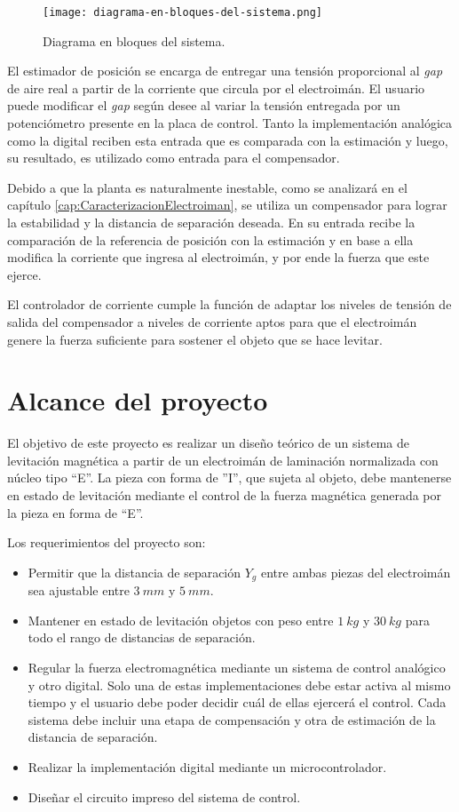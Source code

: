 \begin{figure}[H]
	\centering
	\texttt{[image: diagrama-en-bloques-del-sistema.png]}
	\caption{Diagrama en bloques del sistema.}
	\label{fig:img_diagrama-en-bloques-del-sistema}
\end{figure}

El estimador de posición se encarga de entregar una tensión proporcional al \textsl{gap} de aire real a partir de la corriente que circula por el electroimán. El usuario puede modificar el \textsl{gap} según desee al variar la tensión entregada por un potenciómetro presente en la placa de control. Tanto la implementación analógica como la digital reciben esta entrada que es comparada con la estimación y luego, su resultado, es utilizado como entrada para el compensador.

Debido a que la planta es naturalmente inestable, como se analizará en el capítulo \ref{cap:CaracterizacionElectroiman}, se utiliza un compensador para lograr la estabilidad y la distancia de separación deseada. En su entrada recibe la comparación de la referencia de posición con la estimación y en base a ella modifica la corriente que ingresa al electroimán, y por ende la fuerza que este ejerce.

El controlador de corriente cumple la función de adaptar los niveles de tensión de salida del compensador a niveles de corriente aptos para que el electroimán genere la fuerza suficiente para sostener el objeto que se hace levitar.


\section{Alcance del proyecto}

El objetivo de este proyecto es realizar un diseño teórico de un sistema de levitación magnética a partir de un electroimán de laminación normalizada con núcleo tipo “E''. La pieza con forma de ”I”, que sujeta al objeto, debe mantenerse en estado de levitación mediante el control de la fuerza magnética generada por la pieza en forma de “E”.

Los requerimientos del proyecto son:

\begin{itemize}
\item Permitir que la distancia de separación $Y_{g}$ entre ambas piezas del electroimán sea ajustable entre $3\:mm$ y $5\:mm$.
\item Mantener en estado de levitación objetos con peso entre $1\:kg$ y $30\:kg$ para todo el rango de distancias de separación.
\item Regular la fuerza electromagnética mediante un sistema de control analógico y otro digital. Solo una de estas implementaciones debe estar  activa al mismo tiempo y el usuario debe poder decidir cuál de ellas ejercerá el control.  Cada sistema debe incluir una etapa de compensación y otra de estimación de la distancia de separación.
\item Realizar la implementación digital mediante un microcontrolador.
\item Diseñar el circuito impreso del sistema de control.
\end{itemize}


